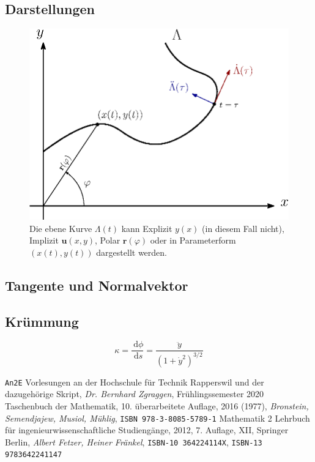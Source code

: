 \documentclass[a4paper]{article}
\numberwithin{equation}{subsection}
\newcommand{\dd}[1]{\ensuremath{~\mathrm{d}#1}}
\newcommand{\deriv}[2]{\ensuremath{\frac{\dd{#1}}{\dd{#2}}}}
\renewcommand{\vec}[1]{\ensuremath{\bm{#1}}}
\begin{document}
\begin{multicols}{2}
\subsection{Darstellungen}
\begin{figure}[H]
\centering
\includegraphics[width=.9\linewidth]{fig/plane-curve.eps}
\caption{Die ebene Kurve \(\Lambda(t)\) kann Explizit \(y(x)\) (in diesem Fall nicht), Implizit \(\vec{u}(x,y)\), Polar \(\vec{r}(\varphi)\) oder in Parameterform \((x(t), y(t))\) dargestellt werden.}
\end{figure}

\subsection{Tangente und Normalvektor}

\subsection{Kr\"ummung}
\[
	\kappa = \deriv{\phi}{s} = \frac{\ddot{y}}{(1+\dot{y}^2)^{3/2}}
\]

\begin{thebibliography}{1}
    \texttt{An2E} Vorlesungen an der Hochschule f\"ur Technik Rapperswil und der dazugeh\"orige Skript,
    \textit{Dr. Bernhard Zgraggen}, Fr\"uhlingssemester 2020
    Taschenbuch der Mathematik,
    10. \"uberarbeitete Auflage, 2016 (1977),
    \textit{Bronstein, Semendjajew, Musiol, M\"uhlig}, 
    \texttt{ISBN 978-3-8085-5789-1}
    Mathematik 2 Lehrbuch für ingenieurwissenschaftliche Studieng\"ange,
    2012, 7. Auflage, XII, Springer Berlin,
    \textit{Albert Fetzer, Heiner Fränkel},
    \texttt{ISBN-10 364224114X},
    \texttt{ISBN-13 9783642241147}
    

\end{thebibliography}
\end{multicols}
\end{document}

